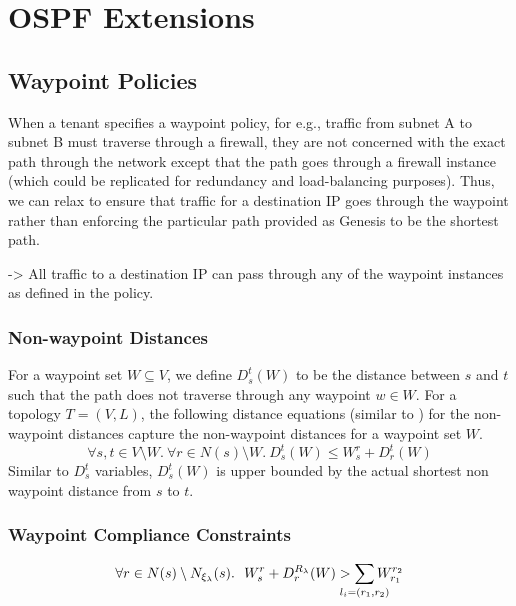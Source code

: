 \section{OSPF Extensions}
\subsection{Waypoint Policies}
When a tenant specifies a waypoint policy, for e.g., traffic from
subnet A to subnet B must traverse through a firewall, they are not
concerned with the exact path through the network except that the 
path goes through a firewall instance (which could be replicated for
redundancy and load-balancing purposes). 
Thus, we can relax 
to ensure that traffic for a destination IP goes 
through the waypoint rather than 
enforcing the particular path provided as Genesis 
to be the shortest path. 

-> All traffic to a destination IP can pass through any of the
waypoint instances as defined in the policy.

\subsubsection{Non-waypoint Distances}
For a waypoint set $W \subseteq V$, we define $D_s^t(W)$ to be the 
distance between $s$ and $t$ such that the path does not
 traverse through any waypoint $w \in W$. For a topology 
 $T = (V,L)$, the following distance equations (similar to 
 ) for the non-waypoint distances capture the
 non-waypoint distances for a waypoint set $W$.
\begin{equation} \label{eq:dist}
\forall s, t \in V \setminus W. ~\forall r \in N(s) \setminus W.~
D_s^t(W) \leq W_s^r + D_r^t(W)
\end{equation}
Similar to $D_s^t$ variables, $D_s^t(W)$ is upper bounded by the
actual shortest non waypoint distance from $s$ to $t$.

\subsubsection{Waypoint Compliance Constraints}

\begin{equation} \label{eq:waypoint}
\forall r \in N(s) \setminus N_{\xi_\lambda}(s).~~
W_{s}^{r}+ D_{r}^{R_\lambda}(W) > \sum_{\mathclap{\substack{l_i=(r_1,r_2)}}} 
W_{r_1}^{r_2}
\end{equation}